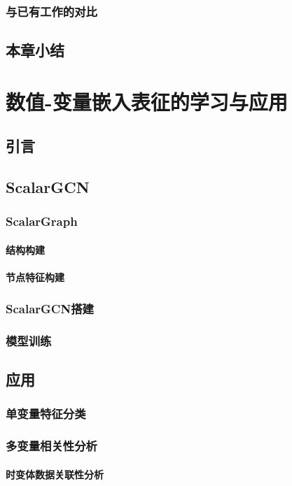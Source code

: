 \subsection{与已有工作的对比}
\section{本章小结}

\chapter{数值-变量嵌入表征的学习与应用}
\section{引言}
\section{ScalarGCN}
\subsection{ScalarGraph}
\subsubsection{结构构建}
\subsubsection{节点特征构建}
\subsection{ScalarGCN搭建}
\subsection{模型训练}
\section{应用}
\subsection{单变量特征分类}
\subsection{多变量相关性分析}
\subsubsection{时变体数据关联性分析}
